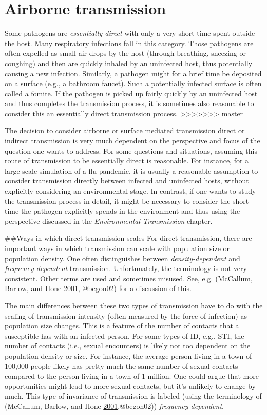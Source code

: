 \documentclass[]{book}
\theoremstyle{definition}
\theoremstyle{definition}
\theoremstyle{definition}
\theoremstyle{remark}
\begin{document}
\section{Airborne transmission}\label{airborne-transmission}

Some pathogens are \emph{essentially direct} with only a very short time
spent outside the host. Many respiratory infections fall in this
category. Those pathogens are often expelled as small air drops by the
host (through breathing, sneezing or coughing) and then are quickly
inhaled by an uninfected host, thus potentially causing a new infection.
Similarly, a pathogen might for a brief time be deposited on a surface
(e.g., a bathroom faucet). Such a potentially infected surface is often
called a fomite. If the pathogen is picked up fairly quickly by an
uninfected host and thus completes the transmission process, it is
sometimes also reasonable to consider this an essentially direct
transmission process.
>>>>>>> master

The decision to consider airborne or surface mediated transmission
direct or indirect transmission is very much dependent on the
perspective and focus of the question one wants to address. For some
questions and situations, assuming this route of transmission to be
essentially direct is reasonable. For instance, for a large-scale
simulation of a flu pandemic, it is usually a reasonable assumption to
consider transmission directly between infected and uninfected hosts,
without explicitly considering an environmental stage. In contrast, if
one wants to study the transmission process in detail, it might be
necessary to consider the short time the pathogen explicitly spends in
the environment and thus using the perspective discussed in the
\emph{Environmental Transmission} chapter.

\#\#Ways in which direct transmission scales For direct transmission,
there are important ways in which transmission can scale with population
size or population density. One often distinguishes between
\emph{density-dependent} and \emph{frequency-dependent} transmission.
Unfortunately, the terminology is not very consistent. Other terms are
used and sometimes misused. See, e.g. (McCallum, Barlow, and Hone
\protect\hyperlink{ref-mccallum01}{2001}, @begon02) for a discussion of
this.

The main differences between these two types of transmission have to do
with the scaling of transmission intensity (often measured by the force
of infection) as population size changes. This is a feature of the
number of contacts that a susceptible has with an infected person. For
some types of ID, e.g., STI, the number of contacts (i.e., sexual
encounters) is likely not too dependent on the population density or
size. For instance, the average person living in a town of 100,000
people likely has pretty much the same number of sexual contacts
compared to the person living in a town of 1 million. One could argue
that more opportunities might lead to more sexual contacts, but it's
unlikely to change by much. This type of invariance of transmission is
labeled (using the terminology of (McCallum, Barlow, and Hone
\protect\hyperlink{ref-mccallum01}{2001},@begon02))
\emph{frequency-dependent}.
\end{document}
